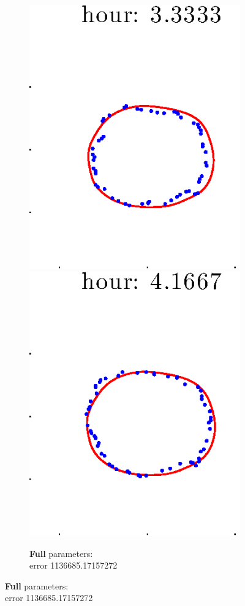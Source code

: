 \documentclass[12pt]{article}
\begin{document}
\begin{figure}[h!]
\begin{subfigure}[b]{.3\textwidth}
		\includegraphics[height=.15\textheight]{Pos10exp2/firsthalf/full5.eps}
		\includegraphics[height=.15\textheight]{Pos10exp2/firsthalf/full6.eps}
		\caption{\textbf{Full} parameters: \\error 1136685.17157272}

\end{subfigure}
\end{figure}
\end{document}
